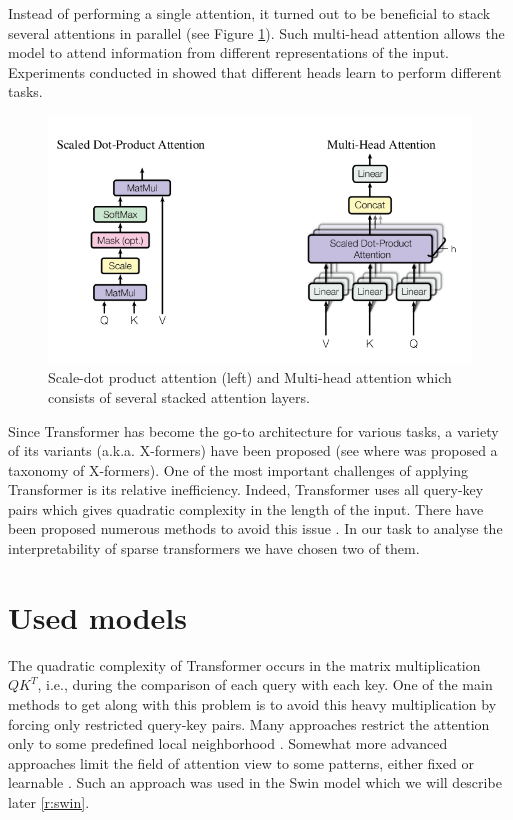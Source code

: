 \documentclass[magisterska,en]{pracamgr}
\begin{document}
Instead of performing a single attention, it turned out to be beneficial to stack several attentions in parallel (see Figure \ref{multi-head}). Such multi-head attention allows the model to attend information from different representations of the input. Experiments conducted in \cite{DBLP:conf/nips/VaswaniSPUJGKP17} showed that different heads learn to perform different tasks.

\begin{figure}[H]
\centering
\includegraphics[scale=0.7]{images/attention_module.png}
\caption{Scale-dot product attention (left) and Multi-head attention which consists of several stacked attention layers.}
\label{multi-head}
\end{figure}



Since Transformer has become the go-to architecture for various tasks, a variety of its variants (a.k.a. X-formers) have been proposed (see \cite{DBLP:journals/corr/abs-2106-04554} where was proposed a taxonomy of X-formers). One of the most important challenges of applying Transformer is its relative inefficiency. Indeed, Transformer uses all query-key pairs which gives quadratic complexity in the length of the input. There have been proposed numerous methods to avoid this issue \cite{DBLP:journals/csur/TayDBM23}. In our task to analyse the interpretability of sparse transformers we have chosen two of them.

\chapter{Used models}\label{r:sparse_transformers}

The quadratic complexity of Transformer occurs in the matrix multiplication $QK^T$, i.e., during the comparison of each query with each key. One of the main methods to get along with this problem is to avoid this heavy multiplication by forcing only restricted query-key pairs. Many approaches restrict the attention only to some predefined local neighborhood \cite{DBLP:conf/icml/ParmarVUKSKT18}. Somewhat more advanced approaches limit the field of attention view to some patterns, either fixed or learnable \cite{DBLP:journals/csur/TayDBM23}. Such an approach was used in the Swin model \cite{DBLP:conf/iccv/LiuL00W0LG21} which we will describe later \ref{r:swin}.
\end{document}
